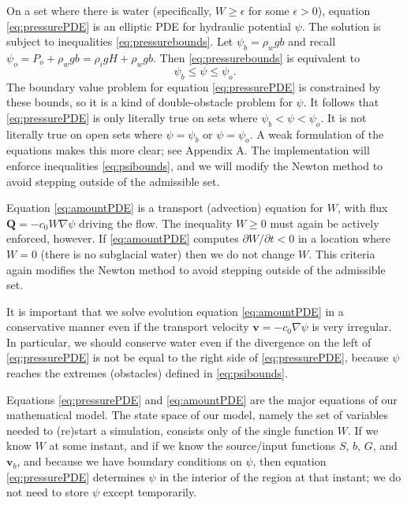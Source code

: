 \documentclass[11pt]{amsart}
\newcommand{\eps}{\epsilon}
\newcommand{\bQ}{\mathbf{Q}}
\newcommand{\bv}{\mathbf{v}}
\begin{document}
On a set where there is water (specifically, $W\ge \eps$ for some $\eps>0$), equation \eqref{eq:pressurePDE} is an elliptic PDE \citep{Ockendonetal2003} for hydraulic potential $\psi$.  The solution is subject to inequalities \eqref{eq:pressurebounds}.  Let $\psi_b = \rho_w g b$ and recall $\psi_o = P_o + \rho_w g b = \rho_i g H + \rho_w g b$.  Then \eqref{eq:pressurebounds} is equivalent to
\begin{equation}\label{eq:psibounds}
\psi_b \le \psi \le \psi_o.
\end{equation}
The boundary value problem for equation \eqref{eq:pressurePDE} is constrained by these bounds, so it is a kind of double-obstacle problem \citep{Rodrigues} for $\psi$.  It follows that \eqref{eq:pressurePDE} is only literally true on sets where $\psi_b < \psi < \psi_o$.  It is not literally true on open sets where $\psi=\psi_b$ or $\psi=\psi_o$.  A weak formulation of the equations makes this more clear; see Appendix A.  The implementation will enforce inequalities \eqref{eq:psibounds}, and we will modify the Newton method to avoid stepping outside of the admissible set.

Equation \eqref{eq:amountPDE} is a transport (advection) equation for $W$, with flux $\bQ = - c_0 W \nabla \psi$ driving the flow.  The inequality $W\ge 0$ must again be actively enforced, however.  If \eqref{eq:amountPDE} computes $\partial W/\partial t < 0$ in a location where $W=0$ (there is no subglacial water) then we do not change $W$.  This criteria again modifies the Newton method to avoid stepping outside of the admissible set.

It is important that we solve evolution equation \eqref{eq:amountPDE} in a conservative manner even if the transport velocity $\bv = -c_0 \nabla \psi$ is very irregular.  In particular, we should conserve water even if the divergence on the left of \eqref{eq:pressurePDE} is not be equal to the right side of \eqref{eq:pressurePDE}, because $\psi$ reaches the extremes (obstacles) defined in \eqref{eq:psibounds}.

Equations \eqref{eq:pressurePDE} and \eqref{eq:amountPDE} are the major equations of our mathematical model.  The state space of our model, namely the set of variables needed to (re)start a simulation, consists only of the single function $W$.  If we know $W$ at some instant, and if we know the source/input functions $S$, $b$, $G$, and $\bv_b$, and because we have boundary conditions on $\psi$, then equation \eqref{eq:pressurePDE} determines $\psi$ in the interior of the region at that instant; we do not need to store $\psi$ except temporarily.
\end{document}
